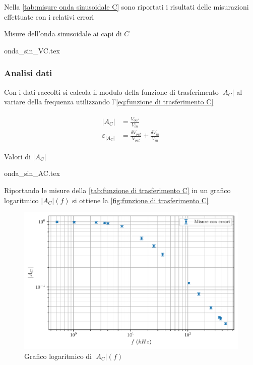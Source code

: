 \documentclass[11pt, a4paper]{article}
\numberwithin{equation}{section} %
\begin{document}
Nella \autoref{tab:misure onda sinusoidale C} sono riportati i risultati delle misurazioni effettuate con i relativi errori

\begin{table}[ht!]
    \centering
    \caption{Misure dell'onda sinusoidale ai capi di $C$}
    {onda_sin_VC.tex}
    \label{tab:misure onda sinusoidale C}
\end{table}

\newpage

\subsubsection{Analisi dati}

Con i dati raccolti si calcola il modulo della funzione di trasferimento $|A_{C}|$ al variare della frequenza utilizzando l'\autoref{eq:funzione di trasferimento C}

\begin{align} \label{eq:funzione di trasferimento C}
    \begin{split}
        |A_{C}| &= \frac{V_{out}}{V_{in}} \\
        \varepsilon_{|A_{C}|} &= \frac{\delta V_{out}}{V_{out}} + \frac{\delta V_{in}}{V_{in}}
    \end{split}
\end{align}

\begin{table}[ht!]
    \centering
    \caption{Valori di $|A_{C}|$}
    {onda_sin_AC.tex}
    \label{tab:funzione di trasferimento C}
\end{table}

Riportando le misure della \autoref{tab:funzione di trasferimento C} in un grafico logaritmico $|A_{C}|(f)$ si ottiene la \autoref{fig:funzione di trasferimento C}

\begin{figure}[ht!]
    \includegraphics{onda_sin_AC(f).pdf}
    \caption{Grafico logaritmico di $|A_{C}|(f)$}
    \label{fig:funzione di trasferimento C}
\end{figure}
\end{document}
